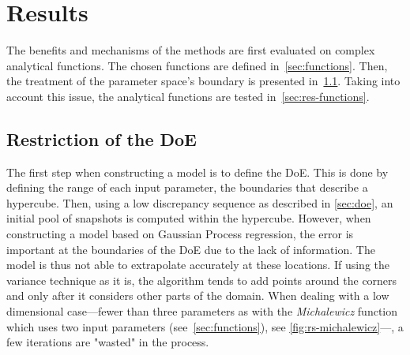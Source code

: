 \section{Results}

The benefits and mechanisms of the methods are first evaluated on complex analytical functions. The chosen functions are defined in~\cref{sec:functions}. Then, the treatment of the parameter space's boundary is presented in~\cref{sec:delta-space}. Taking into account this issue, the analytical functions are tested in~\cref{sec:res-functions}.

\subsection{Restriction of the DoE}
\label{sec:delta-space}

The first step when constructing a model is to define the DoE. This is done by defining the range of each input parameter, the boundaries that describe a hypercube. Then, using a low discrepancy sequence as described in \cref{sec:doe}, an initial pool of snapshots is computed within the hypercube. However, when constructing a model based on Gaussian Process regression, the error is important at the boundaries of the DoE due to the lack of information. The model is thus not able to extrapolate accurately at these locations. If using the variance technique as it is, the algorithm tends to add points around the corners and only after it considers other parts of the domain. When dealing with a low dimensional case---fewer than three parameters as with the \textit{Michalewicz} function which uses two input parameters (see~\cref{sec:functions}), see \cref{fig:rs-michalewicz}---, a few iterations are "wasted" in the process.

